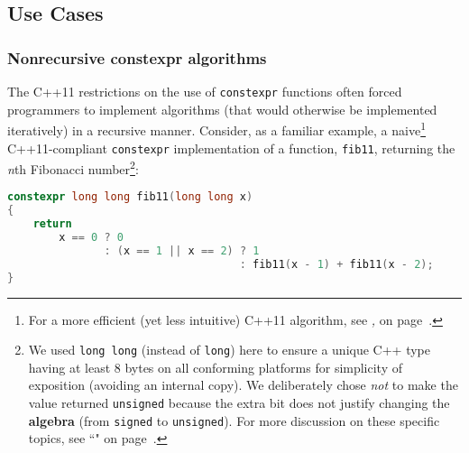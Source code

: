 \subsection[Use Cases]{Use Cases}\label{use-cases-relaxedconstexpr}

\subsubsection[Nonrecursive {\tt constexpr} algorithms]{Nonrecursive {\SubsubsecCode constexpr} algorithms}\label{non-recursive-constexpr-algorithms}

The C++11 restrictions on the use of \texttt{constexpr} functions often
forced programmers to implement algorithms (that would otherwise be
implemented iteratively) in a recursive manner. Consider, as a familiar
example, a naive{\cprotect\footnote{For a more efficient (yet less
intuitive) C++11 algorithm, see \textit{, } on page~\pageref{recursive-fibonacci}.}}
C++11-compliant \texttt{constexpr} implementation of a function,
\texttt{fib11}, returning the \emph{n}th Fibonacci number\footnote{We used \texttt{long}~\texttt{long} (instead of \texttt{long})
here to ensure a unique C++ type having at least 8 bytes on all
conforming platforms for simplicity of exposition (avoiding an internal
copy). We deliberately chose \emph{not} to make the value returned
\texttt{unsigned} because the extra bit does not justify changing the
\textbf{algebra} (from \texttt{signed} to \texttt{unsigned}). For more
discussion on these specific topics, see ``" on page~\pageref{long-long}.}:

\begin{lstlisting}[language=C++]
constexpr long long fib11(long long x)
{
    return
        x == 0 ? 0
               : (x == 1 || x == 2) ? 1
                                    : fib11(x - 1) + fib11(x - 2);
}
\end{lstlisting}

